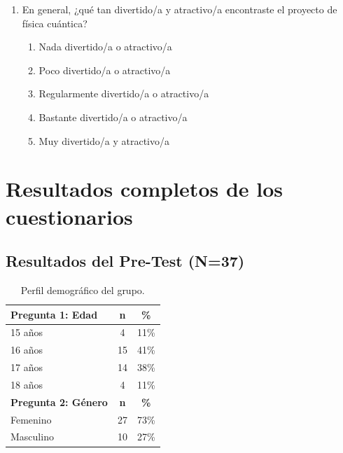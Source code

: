\documentclass[10pt,a4paper]{article}
\begin{document}
\begin{enumerate}
    \item En general, ¿qué tan divertido/a y atractivo/a encontraste el proyecto de física cuántica?
    \begin{enumerate}[label=\alph*)]
        \item Nada divertido/a o atractivo/a
        \item Poco divertido/a o atractivo/a
        \item Regularmente divertido/a o atractivo/a
        \item Bastante divertido/a o atractivo/a
        \item Muy divertido/a y atractivo/a
    \end{enumerate}
\end{enumerate}



\newpage

\section{Resultados completos de los cuestionarios}
\setcounter{table}{0}
\renewcommand{\thetable}{A\arabic{table}}
\subsection{Resultados del Pre-Test (N=37)}
\begin{table}[h!]
\centering
\caption{Perfil demográfico del grupo.}
\begin{tabular}{|l|c|c|}
\hline
\textbf{Pregunta 1: Edad} & \textbf{n} & \textbf{\%} \\
\hline
15 años & 4 & 11\% \\
16 años & 15 & 41\% \\
17 años & 14 & 38\% \\
18 años & 4 & 11\% \\
\hline
\textbf{Pregunta 2: Género} & \textbf{n} & \textbf{\%} \\
\hline
Femenino & 27 & 73\% \\
Masculino & 10 & 27\% \\
\hline
\end{tabular}
\end{table}
\end{document}
